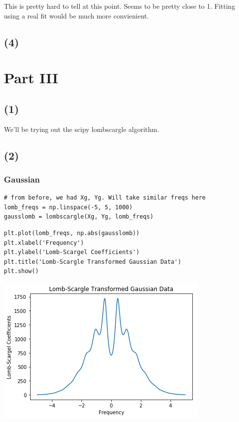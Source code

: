 \documentclass[11pt]{article}
\begin{document}
This is pretty hard to tell at this point. Seems to be pretty close
to 1. Fitting using a real fit would be much more convienient.

\subsection*{(4)}
\label{sec-2-3}

\section*{Part III}
\label{sec-3}

\subsection*{(1)}
\label{sec-3-1}

We'll be trying out the scipy lombscargle algorithm.

\subsection*{(2)}
\label{sec-3-2}
\subsubsection*{Gaussian}
\label{sec-3-2-1}

\begin{verbatim}
# from before, we had Xg, Yg. Will take similar freqs here
lomb_freqs = np.linspace(-5, 5, 1000)
gausslomb = lombscargle(Xg, Yg, lomb_freqs)
\end{verbatim}


\begin{verbatim}
plt.plot(lomb_freqs, np.abs(gausslomb))
plt.xlabel('Frequency')
plt.ylabel('Lomb-Scargel Coefficients')
plt.title('Lomb-Scargle Transformed Gaussian Data')
plt.show()
\end{verbatim}

\includegraphics[width=.9\linewidth]{./obipy-resources/17087VeF.png}
\end{document}
